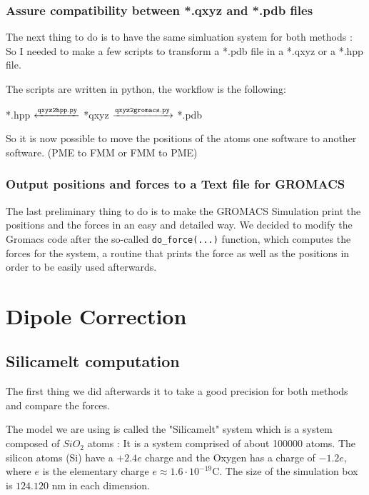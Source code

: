\documentclass[11pt,twoside,a4paper]{report}
\begin{document}
\subsubsection{Assure compatibility between *.qxyz and *.pdb files}

The next thing to do is to have the same simluation system for both methods : So I needed to make a few scripts to transform a *.pdb file in a *.qxyz or a *.hpp file.

The scripts are written in python, the workflow is the following:

{
	\centering 
	{
	
	  *.hpp $\xleftarrow{\tt{qxyz2hpp.py}}$  *qxyz $\xrightarrow{\tt{qxyz2gromacs.py}}$ *.pdb	
	}
}

So it is now possible to move the positions of the atoms one software to another software. (PME to FMM or FMM to PME)

\subsubsection{Output positions and forces to a Text file for GROMACS}

The last preliminary thing to do is to make the GROMACS Simulation print the positions and the forces in an easy and detailed way. We decided to modify the Gromacs code after the so-called {\tt{do\_force(...)}} function, which computes the forces for the system, a routine that prints the force as well as the positions in order to be
 easily used afterwards. 

\section{Dipole Correction}

\subsection{Silicamelt computation}

The first thing we did afterwards it to take a good precision for both methods and compare the forces.


The model we are using is called the "Silicamelt" system which is a system composed of $SiO_2$ atoms : It is a system comprised of about 100000 atoms. The silicon atoms (Si) have a $+2.4e$ charge and the Oxygen has a charge of $-1.2e$, where $e$ is the elementary charge $e \approx 1.6\cdot10^{-19} \text{C}$.
The size of the simulation box is $124.120$ nm in each dimension.
\end{document}
